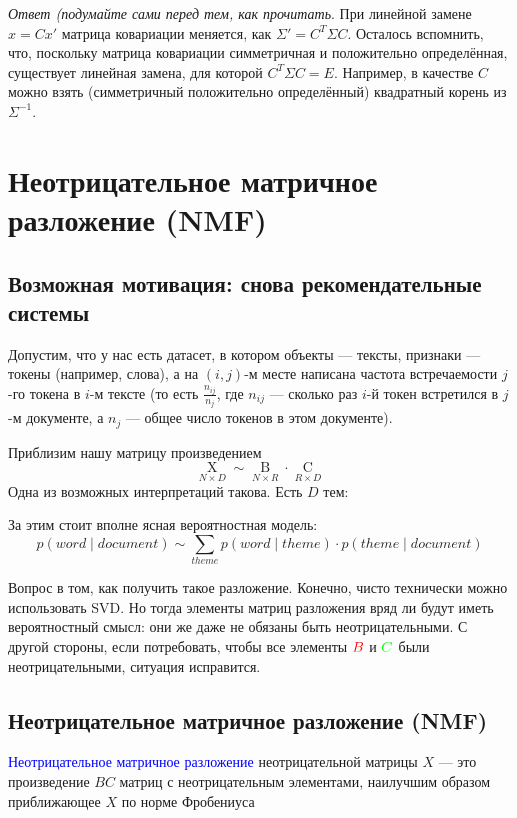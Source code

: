 \documentclass{amsart}
\theoremstyle{definition}
\theoremstyle{remark}
\numberwithin{equation}{section}
\begin{document}
\textit{Ответ (подумайте сами перед тем, как прочитать}. При линейной замене $x = Cx'$ матрица ковариации меняется, как $\Sigma' = C^T\Sigma C$. Осталось вспомнить, что, поскольку матрица ковариации симметричная и положительно определённая, существует линейная замена, для которой $C^T\Sigma C = E$. Например, в качестве $C$ можно взять (симметричный положительно определённый) квадратный корень из $\Sigma^{-1}$.

\section{Неотрицательное матричное разложение (NMF)}

\subsection{Возможная мотивация: снова рекомендательные системы} Допустим, что у нас есть датасет, в котором объекты --- тексты, признаки --- токены (например, слова), а на $(i,j)$-м месте написана частота встречаемости $j$-го токена в $i$-м тексте (то есть $\frac{n_{ij}}{n_j}$, где $n_{ij}$ --- сколько раз $i$-й токен встретился в $j$-м документе, а $n_j$ --- общее число токенов в этом документе).

\begin{center}
\end{center}

Приблизим нашу матрицу произведением
$$\underset{N\times D}{\operatorname{X}} \sim \underset{N\times R}{\operatorname{B}} \cdot \underset{R\times D}{\operatorname{C}}$$
Одна из возможных интерпретаций такова. Есть $D$ тем:

\begin{center}
\end{center}

За этим стоит вполне ясная вероятностная модель:
$$p(word\mid document)\sim\sum_{theme}p(word\mid theme)\cdot p(theme\mid document)$$

Вопрос в том, как получить такое разложение. Конечно, чисто технически можно использовать SVD. Но тогда элементы матриц разложения вряд ли будут иметь вероятностный смысл: они же даже не обязаны быть неотрицательными. С другой стороны, если потребовать, чтобы все элементы $\textcolor{red}{B}$ и $\textcolor{green}{C}$ были неотрицательными, ситуация исправится.

\subsection{Неотрицательное матричное разложение (NMF)} \textcolor{blue}{Неотрицательное матричное разложение} неотрицательной матрицы $X$ --- это произведение $BC$ матриц с неотрицательным элементами, наилучшим образом приближающее $X$ по норме Фробениуса
\end{document}
